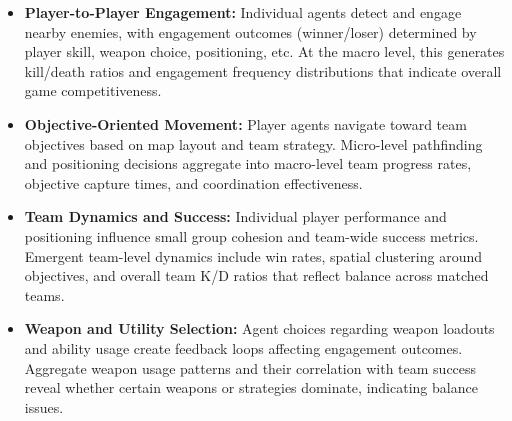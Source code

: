 \documentclass{assignment}
\begin{document}
\begin{itemize}
    \item \textbf{Player-to-Player Engagement:} Individual agents detect and engage nearby enemies, with engagement outcomes (winner/loser) determined by player skill, weapon choice, positioning, etc. At the macro level, this generates kill/death ratios and engagement frequency distributions that indicate overall game competitiveness.

    \item \textbf{Objective-Oriented Movement:} Player agents navigate toward team objectives based on map layout and team strategy. Micro-level pathfinding and positioning decisions aggregate into macro-level team progress rates, objective capture times, and coordination effectiveness.

    \item \textbf{Team Dynamics and Success:} Individual player performance and positioning influence small group cohesion and team-wide success metrics. Emergent team-level dynamics include win rates, spatial clustering around objectives, and overall team K/D ratios that reflect balance across matched teams.

    \item \textbf{Weapon and Utility Selection:} Agent choices regarding weapon loadouts and ability usage create feedback loops affecting engagement outcomes. Aggregate weapon usage patterns and their correlation with team success reveal whether certain weapons or strategies dominate, indicating balance issues.
\end{itemize}
\end{document}
